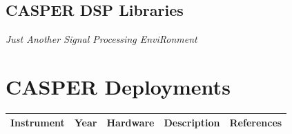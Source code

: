 \documentclass{ws-jai}
\begin{document}

\subsection{CASPER DSP Libraries}


\emph{Just Another Signal Processing EnviRonment}


\section{CASPER Deployments} \label{sec:Deployments}

\newcommand{\rr}{\raggedright}
\newcommand{\tn}{\tabularnewline}
\newcommand{\ac}{\centering}
\begin{landscape}
\begin{table}
  \centering
  \begin{tabular}{p{3cm} c p{4cm} p{8cm} p{2cm}}
  \ac Instrument & \ac Year & \ac Hardware & \ac Description & \ac References \tn
  \hline

\end{tabular}
\end{table}
\end{landscape}
\end{document}
